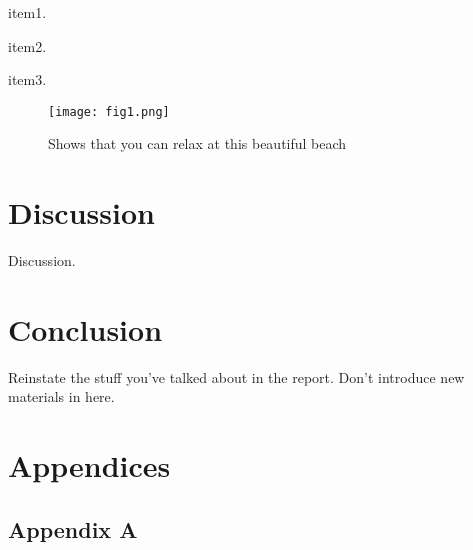 \documentclass[a4paper, 12pt]{article}
\newcounter{foo}
\begin{document}
    \begin{list}{S-}{}
        \item item1.
        
        \item item2.
        
        \item item3.
    \end{list}

    \begin{figure}[h]
        \centering
        \graphicspath{{./wiki/}}
        \texttt{[image: fig1.png]}
        \caption{Shows that you can relax at this beautiful beach}
        \label{Fig:my_label}
    \end{figure}

\section{Discussion}\label{sec:dis}
    Discussion.

\section{Conclusion}\label{sec:conc}
    Reinstate the stuff you've talked about in the report. Don't introduce new materials in here.

\pagebreak

\renewcommand{\bibname}{References}
\renewcommand{\bibsection}{\section{\bibname}}
\renewcommand{\cite}{\citep}

\pagebreak

\section{Appendices}
    \subsection{Appendix A}
\end{document}
